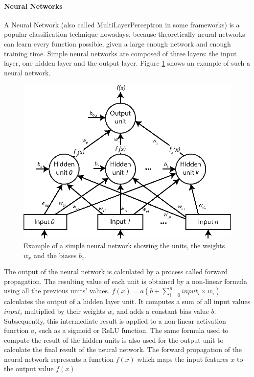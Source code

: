 \paragraph{Neural Networks}

A Neural Network (also called MultiLayerPerceptron in some frameworks) is a popular classification technique nowadays, because theoretically neural networks can learn every function possible, given a large enough network and enough training time. Simple neural networks are composed of three layers: the input layer, one hidden layer and the output layer. Figure \ref{fig:neural_network} shows an example of such a neural network. 

\begin{figure}
	\centering
	\includegraphics{img/neural_network.eps}

	\caption{Example of a simple neural network showing the units, the weights $w_x$ and the biases $b_x$.}
	\label{fig:neural_network}
\end{figure}

The output of the neural network is calculated by a process called forward propagation. The resulting value of each unit is obtained by a non-linear formula using all the previous units' values. $f(x) = a(b + \sum_{i=0}^{n} input_i \times w_{i})$ calculates the output of a hidden layer unit. It computes a sum of all input values $input_i$ multiplied by their weights $w_i$ and adds a constant bias value $b$. Subsequently, this intermediate result is applied to a non-linear activation function $a$, such as a sigmoid or ReLU function. The same formula used to compute the result of the hidden units is also used for the output unit to calculate the final result of the neural network. The forward propagation of the neural network represents a function $f(x)$ which maps the input features $x$ to the output value $f(x)$.

